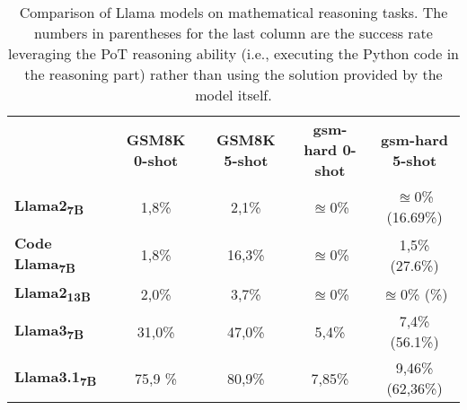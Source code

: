 \begin{table}[h!]
	\centering
	\begin{tabularx}{\textwidth}{Xcccc}
		                                      & \textbf{GSM8K 0-shot} & \textbf{GSM8K 5-shot} & \textbf{gsm-hard 0-shot} & \textbf{gsm-hard 5-shot} \\
		\textbf{Llama2\textsubscript{7B}}     & 1,8\%                 & 2,1\%                 & $\approxeq$0\%           & $\approxeq$0\% (16.69\%) \\
		\textbf{Code Llama\textsubscript{7B}} & 1,8\%                 & 16,3\%                & $\approxeq$0\%           & 1,5\% (27.6\%)           \\
		\textbf{Llama2\textsubscript{13B}}    & 2,0\%                 & 3,7\%                 & $\approxeq$0\%           & $\approxeq$0\% (\%)      \\
		\textbf{Llama3\textsubscript{7B}}     & 31,0\%                & 47,0\%                & 5,4\%                    & 7,4\% (56.1\%)           \\
		\textbf{Llama3.1\textsubscript{7B}}   & 75,9 \%               & 80,9\%                & 7,85\%                   & 9,46\% (62,36\%)         \\
	\end{tabularx}
	\caption{Comparison of Llama models on mathematical reasoning tasks. The numbers in parentheses for the last column are the success rate leveraging the PoT reasoning ability (i.e., executing the Python code in the reasoning part) rather than using the solution provided by the model itself.}
	\label{tab:llama-comparison}
\end{table}

